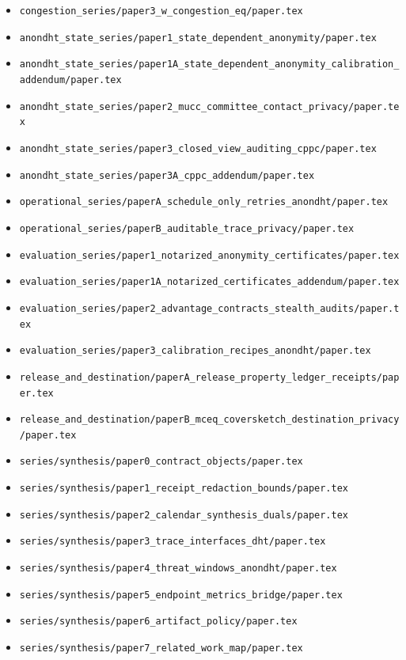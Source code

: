\documentclass[11pt]{article}
\begin{document}
\begin{itemize}[leftmargin=*]
\item \texttt{congestion\_series/paper3\_w\_congestion\_eq/paper.tex}
\item \texttt{anondht\_state\_series/paper1\_state\_dependent\_anonymity/paper.tex}
\item \texttt{anondht\_state\_series/paper1A\_state\_dependent\_anonymity\_calibration\_addendum/paper.tex}
\item \texttt{anondht\_state\_series/paper2\_mucc\_committee\_contact\_privacy/paper.tex}
\item \texttt{anondht\_state\_series/paper3\_closed\_view\_auditing\_cppc/paper.tex}
\item \texttt{anondht\_state\_series/paper3A\_cppc\_addendum/paper.tex}
\item \texttt{operational\_series/paperA\_schedule\_only\_retries\_anondht/paper.tex}
\item \texttt{operational\_series/paperB\_auditable\_trace\_privacy/paper.tex}
\item \texttt{evaluation\_series/paper1\_notarized\_anonymity\_certificates/paper.tex}
\item \texttt{evaluation\_series/paper1A\_notarized\_certificates\_addendum/paper.tex}
\item \texttt{evaluation\_series/paper2\_advantage\_contracts\_stealth\_audits/paper.tex}
\item \texttt{evaluation\_series/paper3\_calibration\_recipes\_anondht/paper.tex}
\item \texttt{release\_and\_destination/paperA\_release\_property\_ledger\_receipts/paper.tex}
\item \texttt{release\_and\_destination/paperB\_mceq\_coversketch\_destination\_privacy/paper.tex}
\item \texttt{series/synthesis/paper0\_contract\_objects/paper.tex}
\item \texttt{series/synthesis/paper1\_receipt\_redaction\_bounds/paper.tex}
\item \texttt{series/synthesis/paper2\_calendar\_synthesis\_duals/paper.tex}
\item \texttt{series/synthesis/paper3\_trace\_interfaces\_dht/paper.tex}
\item \texttt{series/synthesis/paper4\_threat\_windows\_anondht/paper.tex}
\item \texttt{series/synthesis/paper5\_endpoint\_metrics\_bridge/paper.tex}
\item \texttt{series/synthesis/paper6\_artifact\_policy/paper.tex}
\item \texttt{series/synthesis/paper7\_related\_work\_map/paper.tex}

\end{itemize}
\end{document}
